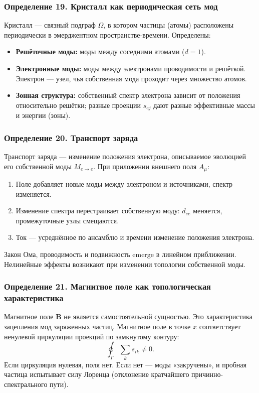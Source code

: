 \documentclass[12pt,a4paper]{article}
\begin{document}
\subsubsection{Определение 19. Кристалл как периодическая сеть мод}
Кристалл --- связный подграф $\Omega$, в котором частицы (атомы) расположены периодически в эмерджентном пространстве-времени. Определены:
\begin{itemize}
    \item \textbf{Решёточные моды:} моды между соседними атомами ($d=1$).
    \item \textbf{Электронные моды:} моды между электронами проводимости и решёткой. Электрон --- узел, чья собственная мода проходит через множество атомов.
    \item \textbf{Зонная структура:} собственный спектр электрона зависит от положения относительно решётки; разные проекции $s_{ej}$ дают разные эффективные массы и энергии (зоны).
\end{itemize}

\subsubsection{Определение 20. Транспорт заряда}
Транспорт заряда --- изменение положения электрона, описываемое эволюцией его собственной моды $M_{e \to e}$. При приложении внешнего поля $A_\mu$:
\begin{enumerate}
    \item Поле добавляет новые моды между электроном и источниками, спектр изменяется.
    \item Изменение спектра перестраивает собственную моду: $d_{ee}$ меняется, промежуточные узлы смещаются.
    \item Ток --- усреднённое по ансамблю и времени изменение положения электрона.
\end{enumerate}
Закон Ома, проводимость и подвижность emerge в линейном приближении. Нелинейные эффекты возникают при изменении топологии собственной моды.

\subsubsection{Определение 21. Магнитное поле как топологическая характеристика}
Магнитное поле $\mathbf{B}$ не является самостоятельной сущностью. Это характеристика зацепления мод заряженных частиц. Магнитное поле в точке $x$ соответствует ненулевой циркуляции проекций по замкнутому контуру:
\begin{equation}
    \oint_\Gamma \sum_k s_{ik} \neq 0.
\end{equation}
Если циркуляция нулевая, поля нет. Если нет --- моды «закручены», и пробная частица испытывает силу Лоренца (отклонение кратчайшего причинно-спектрального пути).
\end{document}

